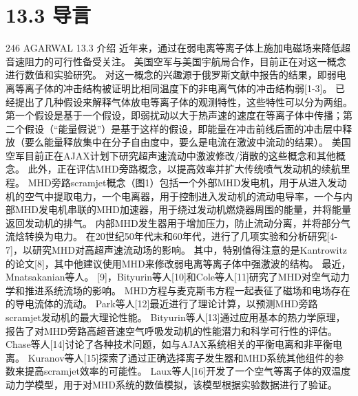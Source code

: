 \documentclass[UTF8,11pt,a4paper,openany,fontset=fandol]{ctexbook}
\begin{document}
\section{13.3 导言}
246 AGARWAL 13.3 介绍 近年来，通过在弱电离等离子体上施加电磁场来降低超音速阻力的可行性备受关注。 美国空军与美国宇航局合作，目前正在对这一概念进行数值和实验研究。 对这一概念的兴趣源于俄罗斯文献中报告的结果，即弱电离等离子体的冲击结构被证明比相同温度下的非电离气体的冲击结构弱[1-3]。 已经提出了几种假设来解释气体放电等离子体的观测特性，这些特性可以分为两组。 第一个假设是基于一个假设，即弱扰动以大于热声速的速度在等离子体中传播；第二个假设（“能量假说”）是基于这样的假设，即能量在冲击前线后面的冲击层中释放（要么能量释放集中在分子自由度中，要么是电流在激波中流动的结果）。 美国空军目前正在AJAX计划下研究超声速流动中激波修改/消散的这些概念和其他概念。 此外，正在评估MHD旁路概念，以提高效率并扩大传统喷气发动机的续航里程。 MHD旁路scramjet概念（图1）包括一个外部MHD发电机，用于从进入发动机的空气中提取电力，一个电离器，用于控制进入发动机的流动电导率，一个与内部MHD发电机串联的MHD加速器，用于绕过发动机燃烧器周围的能量，并将能量返回发动机的排气。 内部MHD发生器用于增加压力，防止流动分离，并将部分气流焓转换为电力。 在20世纪50年代末和60年代，进行了几项实验和分析研究[4-7]，以研究MHD对高超声速流动场的影响。 其中，特别值得注意的是Kantrowitz的论文[8]，其中他建议使用MHD来修改弱电离等离子体中强激波的结构。 最近，Mnatsakanian等人。 [9]，Bityurin等人[10]和Cole等人[11]研究了MHD对空气动力学和推进系统流场的影响。 MHD方程与麦克斯韦方程一起表征了磁场和电场存在的导电流体的流动。 Park等人[12]最近进行了理论计算，以预测MHD旁路scramjet发动机的最大理论性能。 Bityurin等人[13]通过应用基本的热力学原理，报告了对MHD旁路高超音速空气呼吸发动机的性能潜力和科学可行性的评估。 Chase等人[14]讨论了各种技术问题，如与AJAX系统相关的平衡电离和非平衡电离。 Kuranov等人[15]探索了通过正确选择离子发生器和MHD系统其他组件的参数来提高scramjet效率的可能性。 Laux等人[16]开发了一个空气等离子体的双温度动力学模型，用于对MHD系统的数值模拟，该模型根据实验数据进行了验证。
\end{document}
